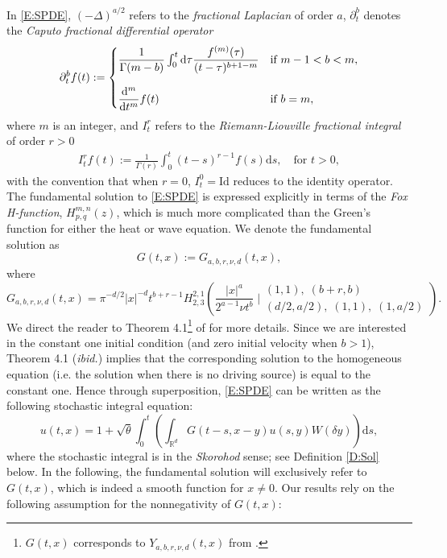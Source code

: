 \documentclass[a4paper,11pt]{article}
\numberwithin{equation}{section}
\numberwithin{equation}{section}
\theoremstyle{plain}
\theoremstyle{definition}
\newcommand{\ud}{\ensuremath{\mathrm{d} }}
\newcommand{\R}{\mathbb{R}}
\begin{document}
In \eqref{E:SPDE}, $(-\Delta)^{a/2}$ refers to the {\it fractional Laplacian} of order $a$,
$\partial^b_t$ denotes the {\it Caputo fractional differential operator}
\begin{align*}
  \partial^b_tf(t) :=
  \begin{cases}
    \dfrac{1}{\Gamma(m-b)} \int_0^t \ud \tau \dfrac{f^{(m)}(\tau)}{(t-\tau)^{b+1-m}} & \text{if } m-1 < b < m, \bigskip \\
    \dfrac{\ud^m}{\ud t^m}f(t)                                                       & \text{if } b=m,
  \end{cases}
\end{align*}
where $m$ is an integer, and $I^r_t$ refers to the {\it Riemann-Liouville fractional integral} of
order $r>0$
\begin{align*}
  I^r_tf(t) := \frac{1}{\Gamma(r)} \int_0^t (t-s)^{r-1}f(s)\ud s, \quad \text{for } t>0,
\end{align*}
with the convention that when $r=0$, $I^0_t = \text{Id}$ reduces to the identity operator. The
fundamental solution to \eqref{E:SPDE} is expressed explicitly in terms of the {\it Fox H-function},
$H^{m,n}_{p,q}(z)$, which is much more complicated than the Green's function for either the heat or
wave equation. We denote the fundamental solution as
\begin{equation} \label{E:GreenFunction}
  G(t,x):= G_{a,b,r,\nu,d}(t,x),
\end{equation}
where
\[
  G_{a,b,r,\nu,d}(t,x) = \pi^{-d/2} |x|^{-d} t^{b+r-1} H^{2,1}_{2,3}\left( \frac{|x|^a}{2^{a-1}\nu t^b}\;  \Bigg \vert  \begin{array}{l}
  (1,1),\; (b+r,b) \\
  (d/2,a/2),\; (1,1),\; (1,a/2)
  \end{array} \right).
\]
We direct the reader to Theorem 4.1\footnote{$G(t,x)$ corresponds to $Y_{a,b,r,\nu,d}(t,x)$ from
\cite{CHN19}.} of \cite{CHN19} for more details. Since we are interested in the constant one initial
condition (and zero initial velocity when $b>1$), Theorem 4.1 ({\it ibid.}) implies that the
corresponding solution to the homogeneous equation (i.e. the solution when there is no driving
source) is equal to the constant one. Hence through superposition, \eqref{E:SPDE} can be written as
the following stochastic integral equation:
\begin{equation} \label{E:spdeint}
  u(t,x) = 1 + \sqrt{\theta}\int_0^t \left( \int_{\R^d}G(t-s,x-y)u(s,y) W(\delta y) \right) \ud s,
\end{equation}
where the stochastic integral is in the {\it Skorohod} sense; see Definition \ref{D:Sol} below.  In
the following, the fundamental solution will exclusively refer to $G(t,x)$, which is indeed a smooth
function for $x\ne 0$. Our results rely on the following assumption for the nonnegativity of
$G(t,x)$:
\end{document}
